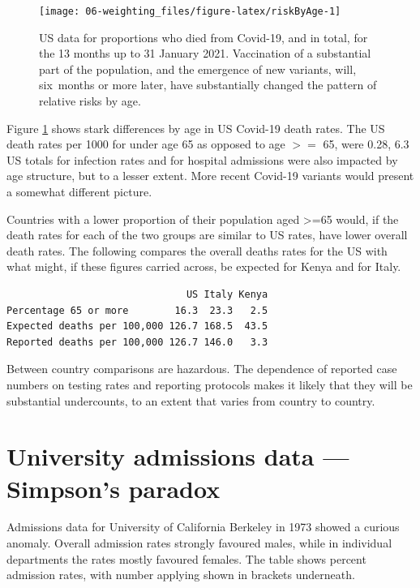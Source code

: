 \documentclass[
  10pt,
  b5paper]{book}
\begin{document}
\begin{figure}[H]

{\centering \texttt{[image: 06-weighting\_files/figure-latex/riskByAge-1]} 

}

\caption{US data for proportions who died from Covid-19, and in total,
for the 13 months up to 31 January 2021. Vaccination of a substantial 
part of the population, and the emergence of new variants, will,
six months or more later, have substantially changed the pattern
of relative risks by age.}\label{fig:riskByAge}
\end{figure}

Figure \ref{fig:riskByAge} shows stark differences by age in US Covid-19 death rates. The US death rates per 1000 for under age 65 as opposed to age \(>=\) 65, were 0.28, 6.3 US totals for infection rates and for hospital admissions were also impacted by age structure, but to a lesser extent. More recent Covid-19 variants would present a somewhat different picture.

Countries with a lower proportion of their population aged \textgreater=65 would, if the death rates for each of the two groups are similar to US rates, have lower overall death rates. The following compares the overall deaths rates for the US with what might, if these figures carried across, be expected for Kenya and for Italy.

\begin{verbatim}
                               US Italy Kenya
Percentage 65 or more        16.3  23.3   2.5
Expected deaths per 100,000 126.7 168.5  43.5
Reported deaths per 100,000 126.7 146.0   3.3
\end{verbatim}

Between country comparisons are hazardous. The dependence of reported case numbers on testing rates and reporting protocols makes it likely that they will be substantial undercounts, to an extent that varies from country to country.

\hypertarget{sec:Y-S}{%
\section{University admissions data --- Simpson's paradox}\label{sec:Y-S}}

Admissions data for University of California Berkeley in 1973 showed a curious anomaly. Overall admission rates strongly favoured males, while in individual departments the rates mostly favoured females. The table shows percent admission rates, with number applying shown in brackets underneath.
\end{document}
